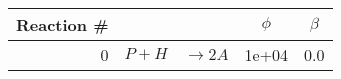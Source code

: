 \begin{tabular}{r|rlcc}
Reaction \# & & & $ \phi $ & $ \beta $ \\
\hline0 & $P + H $ & $\rightarrow 2A $& 1e+04 & 0.0\\
\end{tabular}
